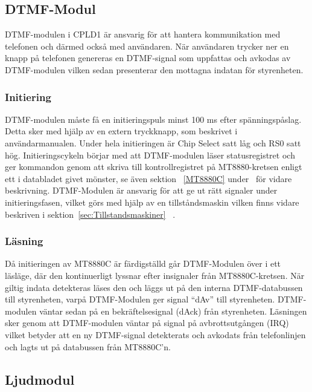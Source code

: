 \documentclass[a4paper,11pt]{article}
\begin{document}
	\subsection{DTMF-Modul}
		
	DTMF-modulen i CPLD1 är ansvarig för att hantera kommunikation med telefonen och därmed också med användaren.
	När användaren trycker ner en knapp på telefonen genereras en DTMF-signal som uppfattas och avkodas av DTMF-modulen vilken sedan presenterar den mottagna indatan för styrenheten.
		
	\subsubsection{Initiering}

	DTMF-modulen måste få en initieringspuls minst 100 ms efter spänningspåslag. Detta sker med hjälp av
	en extern tryckknapp, som beskrivet i användarmanualen. Under hela initieringen är Chip Select satt låg
	och RS0 satt hög. Initieringscykeln börjar med att DTMF-modulen läser statusregistret och ger kommandon genom att skriva till kontrollregistret på MT8880-kretsen enligt ett i databladet givet mönster, se även sektion ~\ref{MT8880C} under~ för vidare beskrivning.
	DTMF-Modulen är ansvarig för att ge ut rätt signaler under initieringsfasen, vilket görs med hjälp av en tillståndsmaskin vilken finns vidare beskriven i sektion~\ref{sec:Tillstandsmaskiner} ~.
		
	\subsubsection{Läsning}

	Då initieringen av MT8880C är färdigställd går DTMF-Modulen över i ett läsläge, där den kontinuerligt lyssnar efter insignaler från MT8880C-kretsen. När giltig indata detekteras läses den och läggs ut på den interna DTMF-databussen till styrenheten, varpå DTMF-Modulen ger signal  ``dAv'' till styrenheten. DTMF-modulen väntar sedan på en bekräftelsesignal (dAck) från styrenheten. Läsningen sker genom att DTMF-modulen väntar på signal på avbrottsutgången (IRQ) vilket betyder att en ny DTMF-signal detekterats  och avkodats från telefonlinjen och lagts ut på databussen från MT8880C'n.


	\subsection{Ljudmodul}
\end{document}
